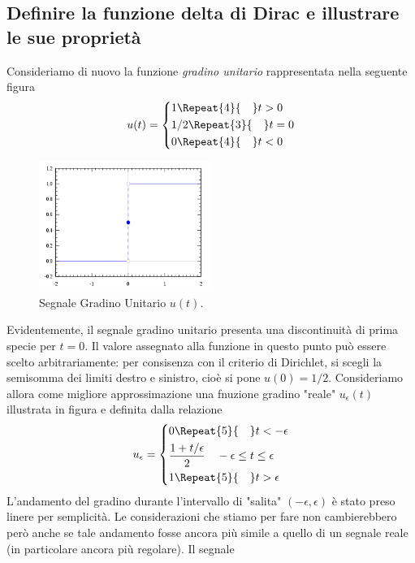 \documentclass[12pt,oneside,openany]{memoir}
\numberwithin{equation}{subsection}
\newcommand{\quads}[1]{\Repeat{#1}{\quad}}
\begin{document}
\subsection{Definire la funzione delta di Dirac e illustrare le sue propriet\`a}
Consideriamo di nuovo la funzione \textit{gradino unitario} rappresentata nella
seguente figura
\[
    u(t) =
        \begin{dcases}
            1 \quads{4} t > 0\\
            1/2 \quads{3} t = 0\\
            0 \quads{4} t < 0
        \end{dcases}
\]
\begin{figure}[H]
    \centering
    \captionsetup{justification=centering}
    \includegraphics[width=0.5\textwidth]{images/heaviside_function.png}
    \caption{Segnale Gradino Unitario $u(t)$.}
\end{figure}
Evidentemente, il segnale gradino unitario presenta una discontinuit\`a di prima
specie per $t = 0$. Il valore assegnato alla funzione in questo punto pu\`o
essere scelto arbitrariamente: per consisenza con il criterio di Dirichlet, si
scegli la semisomma dei limiti destro e sinistro, cio\`e si pone $u(0) = 1/2$.
\bigbreak
Consideriamo allora come migliore approssimazione una fnuzione gradino "reale"
$u_{\epsilon}(t)$ illustrata in figura e definita dalla relazione
\[
    u_{\epsilon} =
        \begin{dcases}
            0 \quads{5} t < -\epsilon\\
            \frac{1 + t/\epsilon}{2} \quad -\epsilon \leq t \leq \epsilon\\
            1 \quads{5} t > \epsilon
        \end{dcases}
\]
L'andamento del gradino durante l'intervallo di "salita" $(-\epsilon, \epsilon)$
\`e stato preso linere per semplicit\`a. Le considerazioni che stiamo per fare
non cambierebbero per\`o anche se tale andamento fosse ancora pi\`u simile a
quello di un segnale reale (in particolare ancora pi\`u regolare). Il segnale
\end{document}
